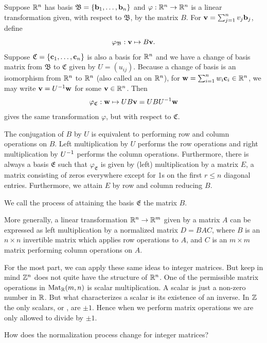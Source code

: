 \documentclass[../algebraNotesMSRI-UP2016.tex]{subfiles}
\begin{document}
\begin{frame}
\begin{ex}
Suppose $\mathbb R^n$ has basis $\mathfrak B=\{\mathbf b_1,\dots,\mathbf b_n\}$ and $\varphi:\mathbb R^n\to \mathbb R^n$ is a linear transformation given, with respect to $\mathfrak B$, by the matrix $B$.  For $\mathbf v=\sum_{j=1}^nv_j\mathbf b_j$, define
\[
\varphi_{\mathfrak B}:\mathbf v \mapsto B\mathbf v.
\]
Suppose $\mathfrak C=\{\mathbf c_1,\dots,\mathbf c_n\}$ is also a basis for $\mathbb R^n$ and we have a change of basis matrix from $\mathfrak B$ to $\mathfrak C$ given by $U=(u_{ij})$.  Because a change of basis is an isomorphism from $\mathbb R^n$ to $\mathbb R^n$ (also called an  on $\mathbb R^n$), for $\mathbf w=\sum_{i=1}^nw_i\mathbf c_i\in \mathbb R^n$, we may write $\mathbf v=U^{-1}\mathbf w$ for some $\mathbf v\in \mathbb R^n$.  Then    
\[
\varphi_{\mathfrak C}:\mathbf w\mapsto UB\mathbf v=UBU^{-1}\mathbf w
\]
gives the same transformation $\varphi$, but with respect to $\mathfrak C$.
\end{ex}
\end{frame}

\begin{frame}[c]
The conjugation of $B$ by $U$ is equivalent to performing row and column operations on $B$.  Left multiplication by $U$ performs the row operations and right multiplication by $U^{-1}$ performs the column operations.  Furthermore, there is always a %
basis $\mathfrak E$ such that $\varphi_{\mathfrak E}$ is given by (left) multiplication by a  matrix $E$, a matrix consisting of zeros everywhere except for 1s on the first $r\leq n$ diagonal entries.  Furthermore, we attain $E$ by row and column reducing $B$.

\smallGap
We call the process of attaining the basis $\mathfrak E$  the matrix $B$.
\end{frame}

\begin{frame}
More generally, a linear transformation $\mathbb R^n\to \mathbb R^m$ given by a matrix $A$ can be expressed as left multiplication by a normalized matrix $D=BAC$, where $B$ is an $n\times n$ invertible matrix which applies row operations to $A$, and $C$ is an $m\times m$ matrix performing column operations on $A$.

\smallGap
For the most part, we can apply these same ideas to integer matrices.  But keep in mind $\mathbb Z^n$ does not quite have the structure of $\mathbb R^n$.  One of the permissible matrix operations in $\operatorname{Mat}_{\mathbb R}(m,n)$ is scalar multiplication.  A scalar is just a non-zero number in $\mathbb R$.  But what characterizes a scalar is its existence of an inverse.  In $\mathbb Z$ the only scalars, or , are $\pm 1$.  Hence when we perform matrix operations we are only allowed to divide by $\pm 1$.

\smallGap
\begin{que}
How does the normalization process change for integer matrices?  
\end{que}
\end{frame}
\end{document}

